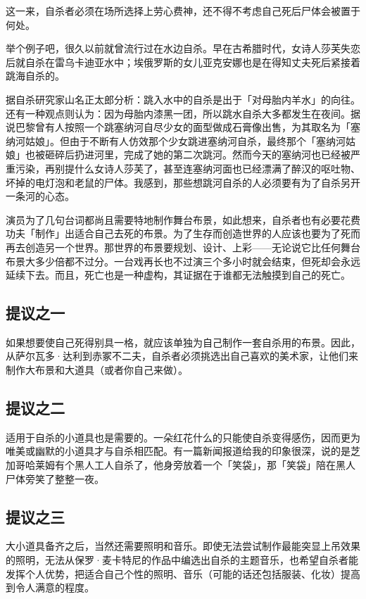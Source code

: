 \documentclass[UTF8]{ctexart}
\begin{document}
这一来，自杀者必须在场所选择上劳心费神，还不得不考虑自己死后尸体会被置于何处。

举个例子吧，很久以前就曾流行过在水边自杀。早在古希腊时代，女诗人莎芙失恋后就自杀在雷乌卡迪亚水中；埃俄罗斯的女儿亚克安娜也是在得知丈夫死后紧接着跳海自杀的。

据自杀研究家山名正太郎分析：跳入水中的自杀是出于「对母胎内羊水」的向往。还有一种观点则认为：因为母胎内漆黑一团，所以跳水自杀大多都发生在夜间。据说巴黎曾有人按照一个跳塞纳河自尽少女的面型做成石膏像出售，为其取名为「塞纳河姑娘」。但由于不断有人仿效那个少女跳进塞纳河自杀，最终那个「塞纳河姑娘」也被砸碎后扔进河里，完成了她的第二次跳河。然而今天的塞纳河也已经被严重污染，再别提什么女诗人莎芙了，甚至连塞纳河面也已经漂满了醉汉的呕吐物、坏掉的电灯泡和老鼠的尸体。我感到，那些想跳河自杀的人必须要有为了自杀另开一条河的心态。

演员为了几句台词都尚且需要特地制作舞台布景，如此想来，自杀者也有必要花费功夫「制作」出适合自己去死的布景。为了生存而创造世界的人应该也要为了死而再去创造另一个世界。那世界的布景要规划、设计、上彩——无论说它比任何舞台布景大多少倍都不过分。一台戏再长也不过演三个多小时就会结束，但死却会永远延续下去。而且，死亡也是一种虚构，其证据在于谁都无法触摸到自己的死亡。

\subsection{提议之一}

如果想要使自己死得别具一格，就应该单独为自己制作一套自杀用的布景。因此，从萨尔瓦多·达利到赤冢不二夫，自杀者必须挑选出自己喜欢的美术家，让他们来制作大布景和大道具（或者你自己来做）。

\subsection{提议之二}

适用于自杀的小道具也是需要的。一朵红花什么的只能使自杀变得感伤，因而更为唯美或幽默的小道具才与自杀相匹配。有一篇新闻报道给我的印象很深，说的是芝加哥哈莱姆有个黑人工人自杀了，他身旁放着一个「笑袋」，那「笑袋」陪在黑人尸体旁笑了整整一夜。

\subsection{提议之三}

大小道具备齐之后，当然还需要照明和音乐。即使无法尝试制作最能突显上吊效果的照明，无法从保罗·麦卡特尼的作品中编选出自杀的主题音乐，也希望自杀者能发挥个人优势，把适合自己个性的照明、音乐（可能的话还包括服装、化妆）提高到令人满意的程度。
\end{document}
